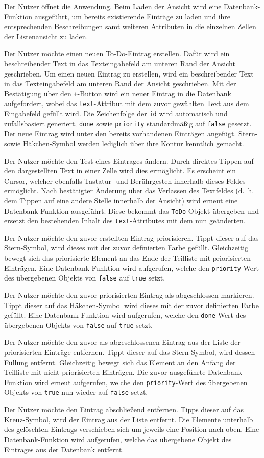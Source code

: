 Der Nutzer öffnet die Anwendung. Beim Laden der Ansicht wird eine Datenbank-Funktion ausgeführt, um bereits existierende Einträge zu laden und ihre entsprechenden Beschreibungen samt weiteren Attributen in die einzelnen Zellen der Listenansicht zu laden. 

Der Nutzer möchte einen neuen To-Do-Eintrag erstellen. Dafür wird ein beschreibender Text in das Texteingabefeld am unteren Rand der Ansicht geschrieben. Um einen neuen Eintrag zu erstellen, wird ein beschreibender Text in das Texteingabefeld am unteren Rand der Ansicht geschrieben. Mit der Bestätigung über den \texttt{+}-Button wird ein neuer Eintrag in die Datenbank aufgefordert, wobei das \texttt{text}-Attribut mit dem zuvor gewählten Text aus dem Eingabefeld gefüllt wird. Die Zeichenfolge der \texttt{id} wird automatisch und zufallsbasiert generiert, \texttt{done} sowie \texttt{priority} standardmäßig auf \texttt{false} gesetzt. Der neue Eintrag wird unter den bereits vorhandenen Einträgen angefügt. Stern- sowie Häkchen-Symbol werden lediglich über ihre Kontur kenntlich gemacht.

Der Nutzer möchte den Test eines Eintrages ändern. Durch direktes Tippen auf den dargestellten Text in einer Zelle wird dies ermöglicht. Es erscheint ein Cursor, welcher ebenfalls Tastatur- und Berührgesten innerhalb dieses Feldes ermöglicht. Nach bestätigter Änderung über das Verlassen des Textfeldes (d.\ h. dem Tippen auf eine andere Stelle innerhalb der Ansicht) wird erneut eine Datenbank-Funktion ausgeführt. Diese bekommt das \texttt{ToDo}-Objekt übergeben und ersetzt den bestehenden Inhalt des \texttt{text}-Attributes mit dem nun geänderten.

Der Nutzer möchte den zuvor erstellten Eintrag priorisieren. Tippt dieser auf das Stern-Symbol, wird dieses mit der zuvor definierten Farbe gefüllt. Gleichzeitig bewegt sich das priorisierte Element an das Ende der Teilliste mit priorisierten Einträgen. Eine Datenbank-Funktion wird aufgerufen, welche den \texttt{priority}-Wert des übergebenen Objekts von \texttt{false} auf \texttt{true} setzt.

Der Nutzer möchte den zuvor priorisierten Eintrag als abgeschlossen markieren. Tippt dieser auf das Häkchen-Symbol wird dieses mit der zuvor definierten Farbe gefüllt. Eine Datenbank-Funktion wird aufgerufen, welche den \texttt{done}-Wert des übergebenen Objekts von \texttt{false} auf \texttt{true} setzt.

Der Nutzer möchte den zuvor als abgeschlossenen Eintrag aus der Liste der priorisierten Einträge entfernen. Tippt dieser auf das Stern-Symbol, wird dessen Füllung entfernt. Gleichzeitig bewegt sich das Element an den Anfang der Teilliste mit nicht-priorisierten Einträgen. Die zuvor ausgeführte Datenbank-Funktion wird erneut aufgerufen, welche den \texttt{priority}-Wert des übergebenen Objekts von \texttt{true} nun wieder auf \texttt{false} setzt.

Der Nutzer möchte den Eintrag abschließend entfernen. Tipps dieser auf das Kreuz-Symbol, wird der Eintrag aus der Liste entfernt. Die Elemente unterhalb des gelöschten Eintrags verschieben sich um jeweils eine Position nach oben. Eine Datenbank-Funktion wird aufgerufen, welche das übergebene Objekt des Eintrages aus der Datenbank entfernt.
